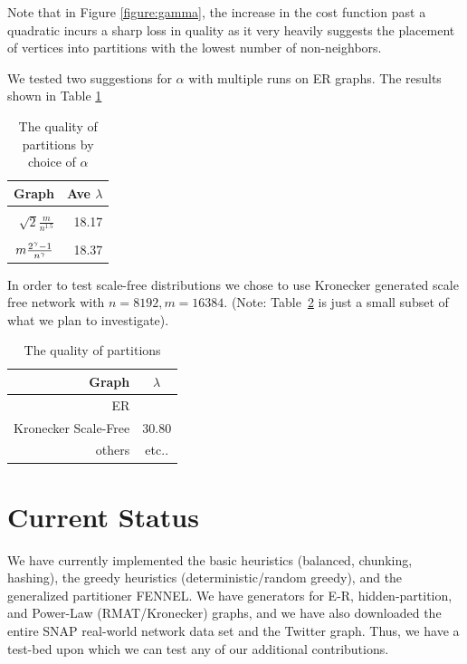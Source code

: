 \documentclass[11pt]{article}
\begin{document}
Note that in Figure \ref{figure:gamma}, the increase in the cost function past a quadratic incurs a sharp loss in quality as it very heavily suggests the placement of vertices into partitions with the lowest number of non-neighbors.

We tested two suggestions for $\alpha$ with multiple runs on ER graphs.
The results shown in Table \ref{table:qualityalpha}
\begin{table}[ht]
\centering
\caption{The quality of partitions by choice of $\alpha$}
\label{table:qualityalpha}
\begin{tabular}{r | r}\hline
Graph & Ave $\lambda$ \\ \hline &\\
$\sqrt{2}\frac{m}{n^1.5}$ & 18.17\\ &\\
$\vspace{3pt}m\frac{2^\gamma-1}{n^\gamma} $&18.37\\
\end{tabular}
\end{table}



In order to test scale-free distributions we chose to use Kronecker generated scale free network with $n=8192, m=16384$. (Note: Table~\ref{table:quality} is just a small subset of what we plan to investigate).

\begin{table}[h]
\centering
\caption{The quality of partitions}
\label{table:quality}
\begin{tabular}{r | c}\hline
Graph & $\lambda$ \\ \hline
ER & \\
Kronecker Scale-Free & 30.80\\
others & etc..\\
\end{tabular}
\end{table}
\newpage
\section{Current Status}
We have currently implemented the basic heuristics (balanced, chunking, hashing), the greedy heuristics (deterministic/random greedy), and the generalized partitioner FENNEL. We have generators for E-R, hidden-partition, and Power-Law (RMAT/Kronecker) graphs, and we have also downloaded the entire SNAP real-world network data set and the Twitter graph. Thus, we have a test-bed upon which we can test any of our additional contributions. 
\end{document}
